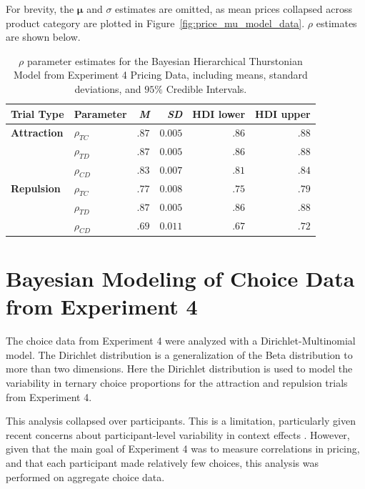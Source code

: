 For brevity, the $\boldsymbol{\mu}$ and $\sigma$ estimates are omitted, as mean prices collapsed across product category are plotted in Figure~\ref{fig:price_mu_model_data}. $\rho$ estimates are shown below.
\begin{table}[ht]
    \centering
    \begin{tabular}{llrrrr}
        \toprule
        Trial Type & Parameter & \textit{M} & \textit{SD} & HDI lower & HDI upper \\
        \midrule
        \textbf{Attraction}  &  $\rho_{TC}$     &    $.87$   &   $0.005$    &  $.86$     & $.88$     \\
                             &  $\rho_{TD}$    &     $.87$   &   $0.005$    &  $.86$     & $.88$     \\
                             &  $\rho_{CD}$    &     $.83$   &   $0.007$    &  $.81$     & $.84$     \\
        \textbf{Repulsion}   &  $\rho_{TC}$     &    $.77$   &   $0.008$    &  $.75$     & $.79$     \\
                             &  $\rho_{TD}$    &     $.87$   &   $0.005$    &  $.86$     & $.88$     \\
                             &  $\rho_{CD}$    &     $.69$   &   $0.011$     &  $.67$     & $.72$     \\
        \bottomrule
    \end{tabular}
    \caption{$\rho$ parameter estimates for the Bayesian Hierarchical Thurstonian Model from Experiment 4 Pricing Data, including means, standard deviations, and $95\%$ Credible Intervals.}
    \label{tab:e4_rho_params}
\end{table}

\chapter{Bayesian Modeling of Choice Data from Experiment 4}

The choice data from Experiment 4 were analyzed with a Dirichlet-Multinomial model. The Dirichlet distribution is a generalization of the Beta distribution to more than two dimensions. Here the Dirichlet distribution is used to model the variability in ternary choice proportions for the attraction and repulsion trials from Experiment 4.

This analysis collapsed over participants. This is a limitation, particularly given recent concerns about participant-level variability in context effects \parencite{liewAppropriacyAveragingStudy2016b,trueblood2015fragile}. However, given that the main goal of Experiment 4 was to measure correlations in pricing, and that each participant made relatively few choices, this analysis was performed on aggregate choice data.

